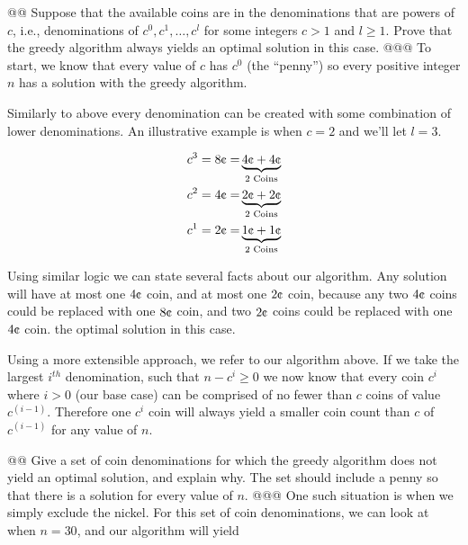 \documentclass[10pt]{article}
\begin{document}
\begin{easylist}[enumerate]
    @@ Suppose that the available coins are in the denominations that are powers of $c$, i.e., denominations of $c^0,
    c^1, \ldots, c^l$ for some integers $c > 1$ and $l \ge 1$. Prove that the greedy algorithm always yields an optimal
    solution in this case.
    @@@ To start, we know that every value of $c$ has $c^0$ (the ``penny'') so every positive integer $n$ has a solution with
        the greedy algorithm.\newline

        Similarly to above every denomination can be created with some combination of lower denominations. An
        illustrative example is when $c=2$ and we'll let $l=3$.

            \[ \begin{aligned}
                c^3 = 8 \cents =& \underbrace{4 \cents + 4 \cents}_{\text{2 Coins}}\\
                c^2 = 4 \cents =& \underbrace{2 \cents + 2 \cents}_{\text{2 Coins}}\\
                c^1 = 2 \cents =& \underbrace{1 \cents + 1 \cents}_{\text{2 Coins}}\\
            \end{aligned} \]

        Using similar logic we can state several facts about our algorithm. Any solution will have at most one $4
        \cents$ coin, and at most one $2 \cents$ coin, because any two $4 \cents$ coins could be replaced with one $8
        \cents$ coin, and two $2 \cents$ coins could be replaced with one $4 \cents$ coin.
        the optimal solution in this case.\newline

        Using a more extensible approach, we refer to our algorithm above. If we take the largest $i^{th}$ denomination,
        such that $n - c^i \ge  0$ we now know that every coin $c^i$ where $i > 0$ (our base case) can be comprised of
        no fewer than $c$ coins of value $c^{(i-1)}$. Therefore one $c^i$ coin will always yield a smaller coin count
        than $c$ of $c^(i-1)$ for any value of $n$.


    @@ Give a set of coin denominations for which the greedy algorithm does not yield an optimal solution, and explain
    why. The set should include a penny so that there is a solution for every value of $n$.
    @@@ One such situation is when we simply exclude the nickel. For this set of coin denominations, we can look at when
    $n=30$, and our algorithm will yield


\end{easylist}
\end{document}
